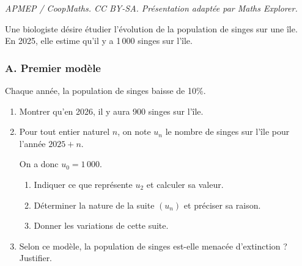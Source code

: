 \documentclass[10pt]{article}
\begin{document}
\noindent\textit{APMEP / CoopMaths. CC BY-SA. Présentation adaptée par Maths Explorer.}\par\medskip
Une biologiste désire étudier l'évolution de la population de singes sur une île. \\
En 2025, elle estime qu'il y a 1\,000 singes sur l'île.

\subsubsection*{A. Premier modèle}
Chaque année, la population de singes baisse de 10\%.

\begin{enumerate}
\item Montrer qu'en 2026, il y aura 900 singes sur l'île.

\item Pour tout entier naturel $n$, on note $u_n$ le nombre de singes sur l'île pour l'année $2025 + n$.

On a donc $u_0 = 1\,000$.

\begin{enumerate}
\item Indiquer ce que représente $u_2$ et calculer sa valeur.
\item Déterminer la nature de la suite $(u_n)$ et préciser sa raison.
\item Donner les variations de cette suite.
\end{enumerate}

\item Selon ce modèle, la population de singes est-elle menacée d'extinction ? Justifier.
\end{enumerate}

\bigskip
\end{document}
